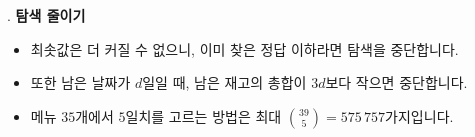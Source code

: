 \begin{frame}{\textbf{\pletter}. \ptitle}
    \textbf{탐색 줄이기}
    \begin{itemize}
        \item 최솟값은 더 커질 수 없으니, 이미 찾은 정답 이하라면 탐색을 중단합니다.
        \item 또한 남은 날짜가 $d$일일 때, 남은 재고의 총합이 $3d$보다 작으면 중단합니다.
        \item 메뉴 $35$개에서 $5$일치를 고르는 방법은 최대 $\binom{39}{5}=575\,757$가지입니다.
    \end{itemize}
\end{frame}
